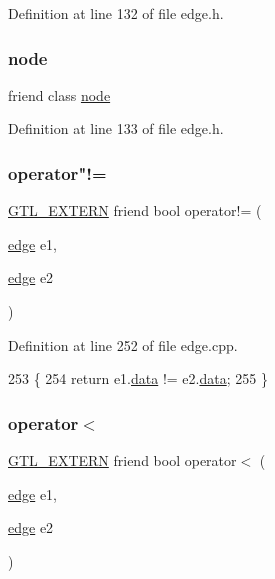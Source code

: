 Definition at line 132 of file edge.\+h.

\mbox{\label{classedge_a3700a7180235e9a28534b15d5922de12}} 
\subsubsection{\texorpdfstring{node}{node}}
{\footnotesize\ttfamily friend class \mbox{\hyperlink{classnode}{node}}\hspace{0.3cm}{\ttfamily [friend]}}



Definition at line 133 of file edge.\+h.

\mbox{\label{classedge_a28eea0e0fbb76b2fbdb0ac1ee87c517b}} 
\subsubsection{\texorpdfstring{operator"!=}{operator!=}}
{\footnotesize\ttfamily \mbox{\hyperlink{_g_t_l_8h_a014cd1e9b3e67a78ae433eda95c8fd25}{G\+T\+L\+\_\+\+E\+X\+T\+E\+RN}} friend bool operator!= (\begin{DoxyParamCaption}\item[{\mbox{\hyperlink{classedge}{edge}}}]{e1,  }\item[{\mbox{\hyperlink{classedge}{edge}}}]{e2 }\end{DoxyParamCaption})\hspace{0.3cm}{\ttfamily [friend]}}



Definition at line 252 of file edge.\+cpp.


\begin{DoxyCode}
253 \{
254     \textcolor{keywordflow}{return} e1.\mbox{\hyperlink{classedge_a0ebb6dfa28b77f47529085049352b436}{data}} != e2.\mbox{\hyperlink{classedge_a0ebb6dfa28b77f47529085049352b436}{data}};
255 \}
\end{DoxyCode}
\mbox{\label{classedge_a2649acdf3e222d1763892556d1807168}} 
\subsubsection{\texorpdfstring{operator$<$}{operator<}}
{\footnotesize\ttfamily \mbox{\hyperlink{_g_t_l_8h_a014cd1e9b3e67a78ae433eda95c8fd25}{G\+T\+L\+\_\+\+E\+X\+T\+E\+RN}} friend bool operator$<$ (\begin{DoxyParamCaption}\item[{\mbox{\hyperlink{classedge}{edge}}}]{e1,  }\item[{\mbox{\hyperlink{classedge}{edge}}}]{e2 }\end{DoxyParamCaption})\hspace{0.3cm}{\ttfamily [friend]}}



